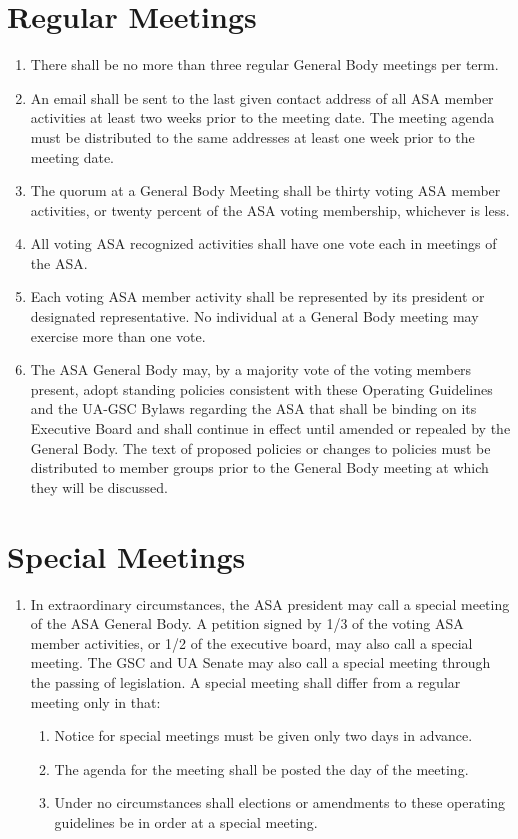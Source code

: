 \documentclass[12pt]{article}
\begin{document}
\section{Regular Meetings}
\begin{enumerate}
    \item There shall be no more than three regular General Body meetings per term.
    \item An email shall be sent to the last given contact address of all ASA member activities at
least two weeks prior to the meeting date. The meeting agenda must be distributed to
the same addresses at least one week prior to the meeting date.
    \item The quorum at a General Body Meeting shall be thirty voting ASA member activities, or
twenty percent of the ASA voting membership, whichever is less.
    \item All voting ASA recognized activities shall have one vote each in meetings of the ASA.
    \item Each voting ASA member activity shall be represented by its president or designated
representative. No individual at a General Body meeting may exercise more than one vote.
    \item The ASA General Body may, by a majority vote of the voting members present, adopt
standing policies consistent with these Operating Guidelines and the UA-GSC Bylaws
regarding the ASA that shall be binding on its Executive Board and shall continue in effect
until amended or repealed by the General Body. The text of proposed policies or changes
to policies must be distributed to member groups prior to the General Body meeting at
which they will be discussed.
\end{enumerate}

\section{Special Meetings}
\begin{enumerate}
    \item In extraordinary circumstances, the ASA president may call a special meeting of the ASA
General Body. A petition signed by 1/3 of the voting ASA member activities, or 1/2 of the
executive board, may also call a special meeting. The GSC and UA Senate may also call a
special meeting through the passing of legislation. A special meeting shall differ from a
regular meeting only in that:
    \begin{enumerate}[noitemsep, label=\alph*.]
        \item Notice for special meetings must be given only two days in advance.
        \item The agenda for the meeting shall be posted the day of the meeting.
        \item Under no circumstances shall elections or amendments to these operating
guidelines be in order at a special meeting.
    \end{enumerate}
\end{enumerate}
\end{document}
